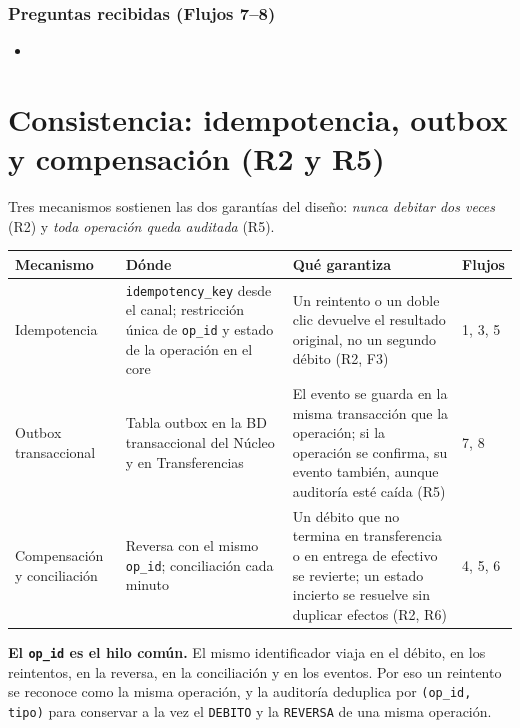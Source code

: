 \documentclass[11pt,a4paper]{article}
\begin{document}
\subsubsection*{Preguntas recibidas (Flujos 7--8)}
\begin{itemize}
  \item %
\end{itemize}

\section{Consistencia: idempotencia, outbox y compensación (R2 y R5)}
Tres mecanismos sostienen las dos garantías del diseño: \emph{nunca debitar dos veces} (R2) y
\emph{toda operación queda auditada} (R5).

\begin{center}
\small
\begin{tabular}{|P{2.6cm}|P{4.6cm}|P{5.6cm}|P{1.6cm}|}
\hline
\textbf{Mecanismo} & \textbf{Dónde} & \textbf{Qué garantiza} & \textbf{Flujos} \\ \hline
Idempotencia & \texttt{idempotency\_key} desde el canal; restricción única de \texttt{op\_id} y estado de la operación en el core &
  Un reintento o un doble clic devuelve el resultado original, no un segundo débito (R2, F3) & 1, 3, 5 \\ \hline
Outbox transaccional & Tabla outbox en la BD transaccional del Núcleo y en Transferencias &
  El evento se guarda en la misma transacción que la operación; si la operación se confirma, su
  evento también, aunque auditoría esté caída (R5) & 7, 8 \\ \hline
Compensación y conciliación & Reversa con el mismo \texttt{op\_id}; conciliación cada minuto &
  Un débito que no termina en transferencia o en entrega de efectivo se revierte; un estado
  incierto se resuelve sin duplicar efectos (R2, R6) & 4, 5, 6 \\ \hline
\end{tabular}
\end{center}

\textbf{El \texttt{op\_id} es el hilo común.} El mismo identificador viaja en el débito, en los
reintentos, en la reversa, en la conciliación y en los eventos. Por eso un reintento se reconoce
como la misma operación, y la auditoría deduplica por \texttt{(op\_id, tipo)} para conservar a la
vez el \texttt{DEBITO} y la \texttt{REVERSA} de una misma operación.
\end{document}
